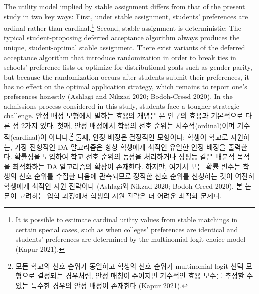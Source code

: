 \documentclass[11pt]{article} %
\theoremstyle{definition}
\theoremstyle{definition}
\begin{document}
\ifen 
The utility model implied by stable assignment differs from that of the present study in two key ways: First, under stable assignment, students' preferences are ordinal rather than cardinal.\footnote{It is possible to estimate cardinal utility values from stable matchings in certain special cases, such as when colleges' preferences are identical and students' preferences are determined by the multinomial logit choice model (Kapur 2021).} Second, stable assignment is deterministic: The typical student-proposing deferred acceptance algorithm always produces the unique, student-optimal stable assignment. There exist variants of the deferred acceptance algorithm that introduce randomization in order to break ties in schools' preference lists or optimize for distributional goals such as gender parity, but because the randomization occurs after students submit their preferences, it has no effect on the optimal application strategy, which remains to report one's preferences honestly (Ashlagi and Nikzad 2020; Bodoh-Creed 2020). In the admissions process considered in this study, students face a tougher strategic challenge.
\else
안정 배정 모형에서 말하는 효용의 개념은 본 연구의 효용과 기본적으로 다른 점 2가지 있다. 첫째, 안정 배정에서 학생의 선호 순위는 서수적(ordinal)이며 기수적(cardinal)이 아니다.\footnote{모든 학교의 선호 순위가 동일하고 학생의 선호 순위가 multinomial logit 선택 모형으로 결정되는 경우처럼, 안정 매칭이 주어지면 기수적인 효용 모수를 추정할 수 있는 특수한 경우의 안정 배정이 존재한다 (Kapur 2021).} 둘째, 안정 배정은 결정적인 모형이다: 학생이 학교로 지원하는, 가장 전형적인 DA 알고리즘은 항상 학생에게 최적인 유일한 안정 배정을 출력한다. 확률성을 도입하여 학교 선호 순위의 동점을 처리하거나 성평등 같은 배분적 목적을 최적화하는 DA 알고리즘의 확장이 존재한다. 하지만, 여기서 모든 확률 변수는 학생의 선호 순위를 수집한 다음에 관측되므로 정직한 선호 순위를 신청하는 것이 여전히 학생에게 최적인 지원 전략이다 (Ashlagi와 Nikzad 2020; Bodoh-Creed 2020). 본 논문이 고려하는 입학 과정에서 학생의 지원 전략은 더 어려운 최적화 문제다. 
\fi
\end{document}
